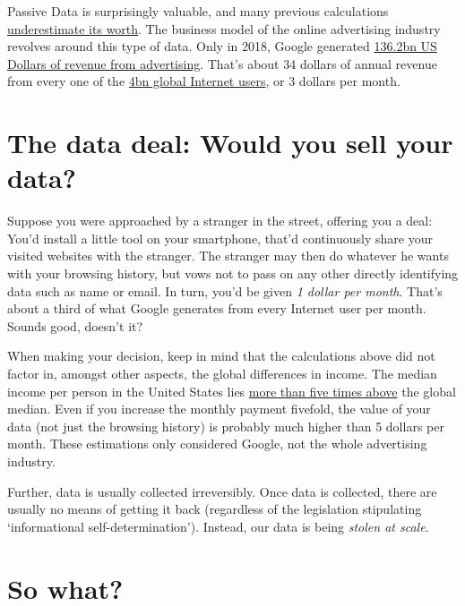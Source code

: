 \documentclass[
]{book}
\begin{document}
Passive Data is surprisingly valuable, and many previous calculations \href{https://ig.ft.com/how-much-is-your-personal-data-worth/}{underestimate its worth}. The business model of the online advertising industry revolves around this type of data. Only in 2018, Google generated \href{https://www.statista.com/statistics/266249/advertising-revenue-of-google/}{136.2bn US Dollars of revenue from advertising}. That's about 34 dollars of annual revenue from every one of the \href{https://wearesocial.com/blog/2018/01/global-digital-report-2018}{4bn global Internet users}, or 3 dollars per month.

\hypertarget{the-data-deal-would-you-sell-your-data}{%
\section{\texorpdfstring{The data deal\textbf{: }Would you sell your data?}{The data deal: Would you sell your data?}}\label{the-data-deal-would-you-sell-your-data}}

Suppose you were approached by a stranger in the street, offering you a deal: You'd install a little tool on your smartphone, that'd continuously share your visited websites with the stranger. The stranger may then do whatever he wants with your browsing history, but vows not to pass on any other directly identifying data such as name or email. In turn, you'd be given \emph{1 dollar per month}. That's about a third of what Google generates from every Internet user per month. Sounds good, doesn't it?

When making your decision, keep in mind that the calculations above did not factor in, amongst other aspects, the global differences in income. The median income per person in the United States lies \href{https://news.gallup.com/poll/166211/worldwide-median-household-income-000.aspx}{more than five times above} the global median. Even if you increase the monthly payment fivefold, the value of your data (not just the browsing history) is probably much higher than 5 dollars per month. These estimations only considered Google, not the whole advertising industry.

Further, data is usually collected irreversibly. Once data is collected, there are usually no means of getting it back (regardless of the legislation stipulating `informational self-determination'). Instead, our data is being \emph{stolen at scale}.

\hypertarget{so-what}{%
\section{So what?}\label{so-what}}
\end{document}

